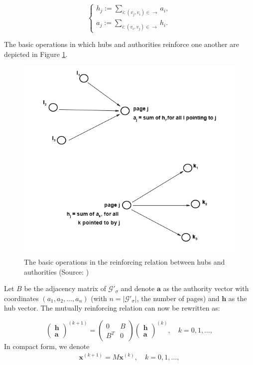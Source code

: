 \documentclass[a4paper,11pt]{report}
\newcommand{\graf}{\mathscr{G}}
\begin{document}
$$\begin{cases} h_j := \sum_{i:(v_j,v_i)\in \to} a_i,\\ 
a_j := \sum_{i:(v_i,v_j)\in \to} h_i.
\end{cases}$$ 

The basic operations in which hubs and authorities reinforce one another are 
depicted in Figure \ref{reinforcing}.
\begin{figure}[h!]
  \centering
  \includegraphics[scale=0.6]{basic.png}\caption{The basic operations in the reinforcing relation between hubs and authorities (Source: \cite{kleinberg})}\label{reinforcing}
\end{figure}

Let $B$ be the adjacency matrix of $\graf'_\sigma$ and denote $\mathbf{a}$ as the authority vector with coordinates $(a_1,a_2,\ldots,a_n)$ (with $n = 
 |\graf'_\sigma|$, the number of pages) and $\mathbf{h}$ as the hub vector. The mutually reinforcing relation can now be rewritten 
as:

$$\begin{pmatrix} 
\textbf{h}\\
\textbf{a}
\end{pmatrix}^{(k+1)} = \begin{pmatrix} 
0 & B\\
B^T & 0
\end{pmatrix} \begin{pmatrix} 
\textbf{h}\\
\textbf{a}
\end{pmatrix}^{(k)},\quad k = 0, 1,\ldots,$$
In compact form, we denote
\begin{eqnarray}\label{compactform}
  \mathbf{x}^{(k+1)} = M\mathbf{x}^{(k)},\quad k = 0, 1,\ldots,
\end{eqnarray}
\end{document}
